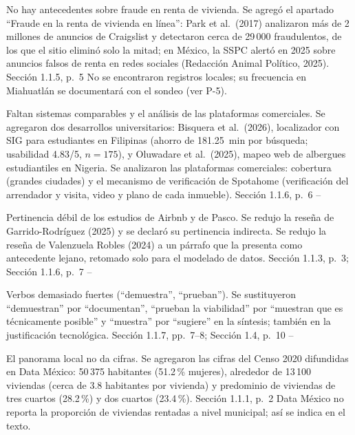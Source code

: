 \documentclass[10pt]{article}
\begin{document}
\begin{matriz}
  {No hay antecedentes sobre fraude en renta de vivienda.}
  {Se agregó el apartado ``Fraude en la renta de vivienda en línea'': Park et al.\ (2017) analizaron más de 2 millones de anuncios de Craigslist y detectaron cerca de 29\,000 fraudulentos, de los que el sitio eliminó solo la mitad; en México, la SSPC alertó en 2025 sobre anuncios falsos de renta en redes sociales (Redacción Animal Político, 2025).}
  {Sección 1.1.5, p.~5}
  {\Atendida}
  {No se encontraron registros locales; su frecuencia en Miahuatlán se documentará con el sondeo (ver P-5).}
  {}

  {Faltan sistemas comparables y el análisis de las plataformas comerciales.}
  {Se agregaron dos desarrollos universitarios: Bisquera et al.\ (2026), localizador con SIG para estudiantes en Filipinas (ahorro de 181.25~min por búsqueda; usabilidad 4.83/5, $n = 175$), y Oluwadare et al.\ (2025), mapeo web de albergues estudiantiles en Nigeria.\newline
   Se analizaron las plataformas comerciales: cobertura (grandes ciudades) y el mecanismo de verificación de Spotahome (verificación del arrendador y visita, video y plano de cada inmueble).}
  {Sección 1.1.6, p.~6}
  {\Atendida}{--}{}

  {Pertinencia débil de los estudios de Airbnb y de Pasco.}
  {Se redujo la reseña de Garrido-Rodríguez (2025) y se declaró su pertinencia indirecta.\newline
   Se redujo la reseña de Valenzuela Robles (2024) a un párrafo que la presenta como antecedente lejano, retomado solo para el modelado de datos.}
  {Sección 1.1.3, p.~3; Sección 1.1.6, p.~7}
  {\Atendida}{--}{}

  {Verbos demasiado fuertes (``demuestra'', ``prueban'').}
  {Se sustituyeron ``demuestran'' por ``documentan'', ``prueban la viabilidad'' por ``muestran que es técnicamente posible'' y ``muestra'' por ``sugiere'' en la síntesis; también en la justificación tecnológica.}
  {Sección 1.1.7, pp.~7--8; Sección 1.4, p.~10}
  {\Atendida}{--}{}

  {El panorama local no da cifras.}
  {Se agregaron las cifras del Censo 2020 difundidas en Data México: 50\,375 habitantes (51.2\,\% mujeres), alrededor de 13\,100 viviendas (cerca de 3.8 habitantes por vivienda) y predominio de viviendas de tres cuartos (28.2\,\%) y dos cuartos (23.4\,\%).}
  {Sección 1.1.1, p.~2}
  {\Atendida}
  {Data México no reporta la proporción de viviendas rentadas a nivel municipal; así se indica en el texto.}
  {}


\end{matriz}
\end{document}
